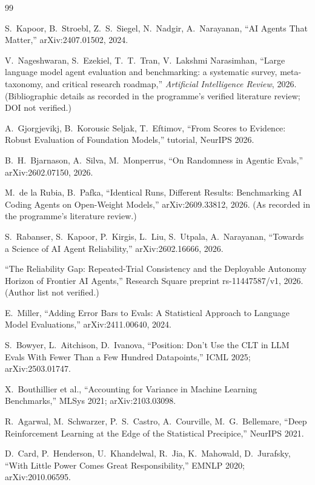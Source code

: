\documentclass[11pt]{article}
\begin{document}
\begin{thebibliography}{99}

 S.~Kapoor, B.~Stroebl, Z.~S.~Siegel, N.~Nadgir,
A.~Narayanan, ``AI Agents That Matter,'' arXiv:2407.01502, 2024.

 V.~Nageshwaran, S.~Ezekiel, T.~T.~Tran,
V.~Lakshmi Narasimhan, ``Large language model agent evaluation and
benchmarking: a systematic survey, meta-taxonomy, and critical
research roadmap,'' \emph{Artificial Intelligence Review}, 2026.
(Bibliographic details as recorded in the programme's verified
literature review; DOI not verified.)

 A.~Gjorgjevikj, B.~Korousic Seljak,
T.~Eftimov, ``From Scores to Evidence: Robust Evaluation of Foundation
Models,'' tutorial, NeurIPS 2026.

 B.~H.~Bjarnason, A.~Silva, M.~Monperrus, ``On
Randomness in Agentic Evals,'' arXiv:2602.07150, 2026.

 M.~de la Rubia, B.~Pafka, ``Identical Runs,
Different Results: Benchmarking AI Coding Agents on Open-Weight
Models,'' arXiv:2609.33812, 2026. (As recorded in the programme's
literature review.)

 S.~Rabanser, S.~Kapoor, P.~Kirgis, L.~Liu,
S.~Utpala, A.~Narayanan, ``Towards a Science of AI Agent
Reliability,'' arXiv:2602.16666, 2026.

 ``The Reliability Gap: Repeated-Trial
Consistency and the Deployable Autonomy Horizon of Frontier AI
Agents,'' Research Square preprint rs-11447587/v1, 2026. (Author list
not verified.)

 E.~Miller, ``Adding Error Bars to Evals: A
Statistical Approach to Language Model Evaluations,''
arXiv:2411.00640, 2024.

 S.~Bowyer, L.~Aitchison, D.~Ivanova, ``Position:
Don't Use the CLT in LLM Evals With Fewer Than a Few Hundred
Datapoints,'' ICML 2025; arXiv:2503.01747.

 X.~Bouthillier et al., ``Accounting for
Variance in Machine Learning Benchmarks,'' MLSys 2021;
arXiv:2103.03098.

 R.~Agarwal, M.~Schwarzer, P.~S.~Castro,
A.~Courville, M.~G.~Bellemare, ``Deep Reinforcement Learning at the
Edge of the Statistical Precipice,'' NeurIPS 2021.

 D.~Card, P.~Henderson, U.~Khandelwal, R.~Jia,
K.~Mahowald, D.~Jurafsky, ``With Little Power Comes Great
Responsibility,'' EMNLP 2020; arXiv:2010.06595.


\end{thebibliography}
\end{document}
